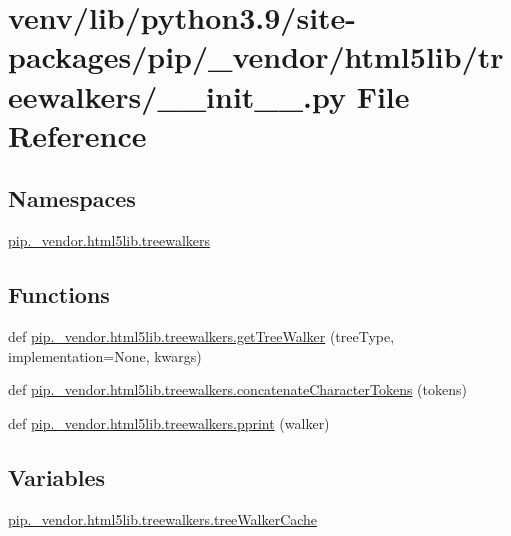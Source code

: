 \hypertarget{venv_2lib_2python3_89_2site-packages_2pip_2__vendor_2html5lib_2treewalkers_2____init_____8py}{}\section{venv/lib/python3.9/site-\/packages/pip/\+\_\+vendor/html5lib/treewalkers/\+\_\+\+\_\+init\+\_\+\+\_\+.py File Reference}
\label{venv_2lib_2python3_89_2site-packages_2pip_2__vendor_2html5lib_2treewalkers_2____init_____8py}
\subsection*{Namespaces}
\begin{DoxyCompactItemize}
\item 
 \hyperlink{namespacepip_1_1__vendor_1_1html5lib_1_1treewalkers}{pip.\+\_\+vendor.\+html5lib.\+treewalkers}
\end{DoxyCompactItemize}
\subsection*{Functions}
\begin{DoxyCompactItemize}
\item 
def \hyperlink{namespacepip_1_1__vendor_1_1html5lib_1_1treewalkers_afd1e779f070509c261273bdf7b3028f4}{pip.\+\_\+vendor.\+html5lib.\+treewalkers.\+get\+Tree\+Walker} (tree\+Type, implementation=None, kwargs)
\item 
def \hyperlink{namespacepip_1_1__vendor_1_1html5lib_1_1treewalkers_aab9e4c5d1e598b631dc17cadf71c546e}{pip.\+\_\+vendor.\+html5lib.\+treewalkers.\+concatenate\+Character\+Tokens} (tokens)
\item 
def \hyperlink{namespacepip_1_1__vendor_1_1html5lib_1_1treewalkers_a97bbd349deba74525c5ede6f1db95596}{pip.\+\_\+vendor.\+html5lib.\+treewalkers.\+pprint} (walker)
\end{DoxyCompactItemize}
\subsection*{Variables}
\begin{DoxyCompactItemize}
\item 
\hyperlink{namespacepip_1_1__vendor_1_1html5lib_1_1treewalkers_a55d556756856eebe0f8e79ece5d07858}{pip.\+\_\+vendor.\+html5lib.\+treewalkers.\+tree\+Walker\+Cache}
\end{DoxyCompactItemize}
